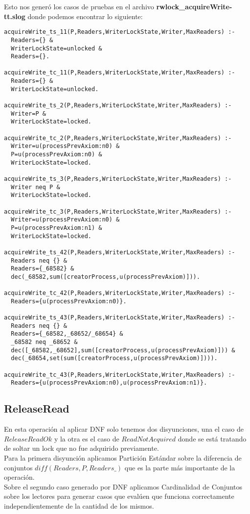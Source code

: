 \documentclass[a4paper, 12pt]{article}
\begin{document}
Esto nos generó los casos de pruebas en el archivo \textbf{rwlock\_acquireWrite-tt.slog} donde podemos encontrar lo siguiente:
\begin{verbatim}
acquireWrite_ts_11(P,Readers,WriterLockState,Writer,MaxReaders) :-
  Readers={} &
  WriterLockState=unlocked &
  Readers={}.

acquireWrite_tc_11(P,Readers,WriterLockState,Writer,MaxReaders) :-
  Readers={} &
  WriterLockState=unlocked.

acquireWrite_ts_2(P,Readers,WriterLockState,Writer,MaxReaders) :-
  Writer=P &
  WriterLockState=locked.

acquireWrite_tc_2(P,Readers,WriterLockState,Writer,MaxReaders) :-
  Writer=u(processPrevAxiom:n0) &
  P=u(processPrevAxiom:n0) &
  WriterLockState=locked.

acquireWrite_ts_3(P,Readers,WriterLockState,Writer,MaxReaders) :-
  Writer neq P &
  WriterLockState=locked.

acquireWrite_tc_3(P,Readers,WriterLockState,Writer,MaxReaders) :-
  Writer=u(processPrevAxiom:n0) &
  P=u(processPrevAxiom:n1) &
  WriterLockState=locked.

acquireWrite_ts_42(P,Readers,WriterLockState,Writer,MaxReaders) :-
  Readers neq {} &
  Readers={_68582} &
  dec(_68582,sum([creatorProcess,u(processPrevAxiom)])).

acquireWrite_tc_42(P,Readers,WriterLockState,Writer,MaxReaders) :-
  Readers={u(processPrevAxiom:n0)}.

acquireWrite_ts_43(P,Readers,WriterLockState,Writer,MaxReaders) :-
  Readers neq {} &
  Readers={_68582,_68652/_68654} &
  _68582 neq _68652 &
  dec([_68582,_68652],sum([creatorProcess,u(processPrevAxiom)])) &
  dec(_68654,set(sum([creatorProcess,u(processPrevAxiom)]))).

acquireWrite_tc_43(P,Readers,WriterLockState,Writer,MaxReaders) :-
  Readers={u(processPrevAxiom:n0),u(processPrevAxiom:n1)}.
\end{verbatim}
\subsection{ReleaseRead}
En esta operación al aplicar DNF solo tenemos dos disyunciones, una el caso de $ReleaseReadOk$ y la otra es el caso de $ReadNotAcquired$ donde se está tratando de soltar un lock que no fue adquirido previamente. \\ Para la primera disyunción aplicamos Partición Estándar sobre la diferencia de conjuntos $diff(Readers, {P}, Readers\_)$ que es la parte más importante de la operación. \\ Sobre el segundo caso generado por DNF aplicamos Cardinalidad de Conjuntos sobre los lectores para generar casos que evalúen que funciona correctamente independientemente de la cantidad de los mismos.
\end{document}
